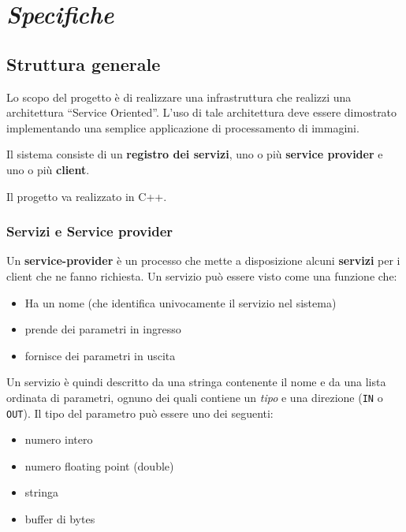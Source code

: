 \documentclass[a4paper,twoside]{article}
\title{\emph{Service Oriented Architecture}\texorpdfstring{\\}{}\vskip2ex
       \Large Progetto Unix di\texorpdfstring{\\}{}
       Sistemi Operativi e Programmazione Distribuita}
\author{Antonio Macrì \quad Francesco Racciatti}
\begin{document}
\maketitle
{}
\tableofcontents
{}
\null
\clearpage



\section{\textsl{Specifiche}}

\begingroup
\slshape

\subsection{Struttura generale}

Lo scopo del progetto è di realizzare una infrastruttura che realizzi una architettura “Service Oriented”. L'uso di tale architettura deve essere dimostrato implementando una semplice applicazione di processamento di immagini.

Il sistema consiste di un \textbf{registro dei servizi}, uno o più \textbf{service provider} e uno o più \textbf{client}.

Il progetto va realizzato in C++.

\subsubsection{Servizi e Service provider}
Un \textbf{service-provider} è un processo che mette a disposizione alcuni \textbf{servizi} per i client che ne fanno richiesta. Un servizio può essere visto come una funzione che:
\begin{itemize}
\item Ha un nome (che identifica univocamente il servizio nel sistema)
\item prende dei parametri in ingresso
\item fornisce dei parametri in uscita
\end{itemize}

Un servizio è quindi descritto da una stringa contenente il nome e da una lista ordinata di parametri, ognuno dei quali contiene un \emph{tipo} e una direzione (\texttt{IN} o \texttt{OUT}). Il tipo del parametro può essere uno dei seguenti:
\begin{itemize}
\item numero intero
\item numero floating point (double)
\item stringa
\item buffer di bytes
\end{itemize}
\end{document}
